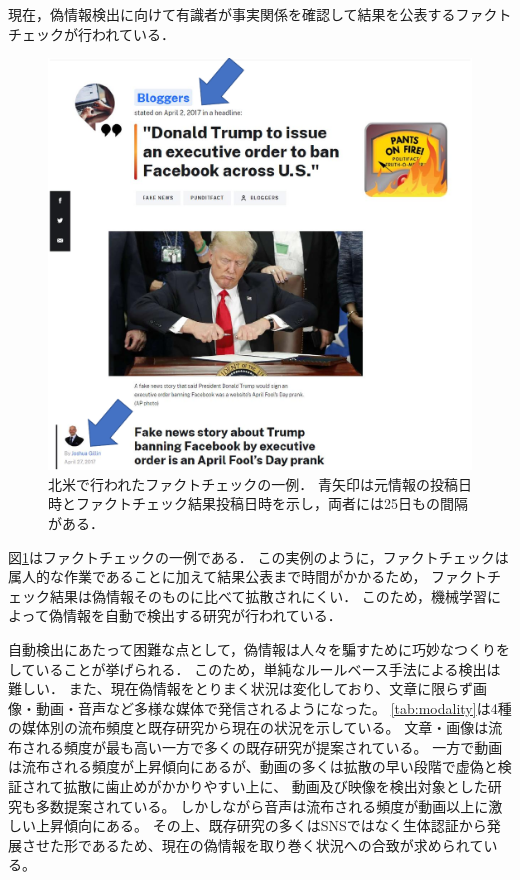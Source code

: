 現在，偽情報検出に向けて有識者が事実関係を確認して結果を公表するファクトチェックが行われている．
\begin{figure}[p]
    \centering
    \includegraphics[width=0.8\linewidth]{figures/fact-check.pdf}
    \caption{
        北米で行われたファクトチェックの一例．
        青矢印は元情報の投稿日時とファクトチェック結果投稿日時を示し，両者には25日もの間隔がある．
        }
    \label{fig:example}
\end{figure}

図\ref{fig:example}はファクトチェックの一例である\cite{gillin_2017}．
この実例のように，ファクトチェックは属人的な作業であることに加えて結果公表まで時間がかかるため，
ファクトチェック結果は偽情報そのものに比べて拡散されにくい．
このため，機械学習によって偽情報を自動で検出する研究が行われている．

自動検出にあたって困難な点として，偽情報は人々を騙すために巧妙なつくりをしていることが挙げられる．
このため，単純なルールベース手法による検出は難しい．
また、現在偽情報をとりまく状況は変化しており、文章に限らず画像・動画・音声など多様な媒体で発信されるようになった。
\cref{tab:modality}は4種の媒体別の流布頻度と既存研究から現在の状況を示している。
文章・画像は流布される頻度が最も高い一方で多くの既存研究が提案されている。
一方で動画は流布される頻度が上昇傾向にあるが、動画の多くは拡散の早い段階で虚偽と検証されて拡散に歯止めがかかりやすい上に、
動画及び映像を検出対象とした研究も多数提案されている。
しかしながら音声は流布される頻度が動画以上に激しい上昇傾向にある。
その上、既存研究の多くはSNSではなく生体認証から発展させた形であるため、現在の偽情報を取り巻く状況への合致が求められている。
% 

